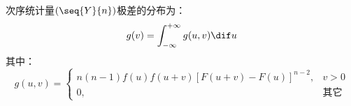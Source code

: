 \begin{corollary}
	次序统计量$(\seq{Y}{n})$极差的分布为：
	\begin{equation*}
		g(v)=\int_{-\infty}^{+\infty}g(u,v)\dif u
	\end{equation*}
	其中：
	\begin{equation*}
		g(u,v)=
		\begin{cases}
			n(n-1)f(u)f(u+v)[F(u+v)-F(u)]^{n-2},&v>0 \\
			0,&\text{其它}
		\end{cases}
	\end{equation*}
\end{corollary}